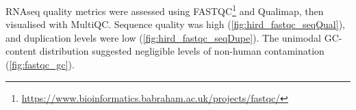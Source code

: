 
\gls{RNAseq} quality metrics were assessed using FASTQC\footnote{\url{https://www.bioinformatics.babraham.ac.uk/projects/fastqc/}} and Qualimap\autocite{okonechnikov2015QualimapAdvancedMultisample}, then visualised with MultiQC\autocite{ewels2016MultiQCSummarizeAnalysis}.
Sequence quality was high (\autoref{fig:hird_fastqc_seqQual}), and duplication levels were low (\autoref{fig:hird_fastqc_seqDupe}).
The unimodal GC-content distribution suggested negligible levels of non-human contamination (\autoref{fig:fastqc_gc}).

